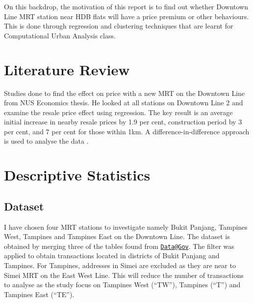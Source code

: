 \documentclass[]{book}
\begin{document}
On this backdrop, the motivation of this report is to find out whether
Downtown Line MRT station near HDB flats will have a price premium or
other behaviours. This is done through regression and clustering
techniques that are learnt for Computational Urban Analysis class.

\chapter{Literature Review}\label{literature-review}

Studies done to find the effect on price with a new MRT on the Downtown
Line from NUS Economics thesis. He looked at all stations on Downtown
Line 2 and examine the resale price effect using regression. The key
result is an average initial increase in nearby resale prices by 1.9 per
cent, construction period by 3 per cent, and 7 per cent for those within
1km. A difference-in-difference approach is used to analyse the data
\citep{Chia}.

\chapter{Descriptive Statistics}\label{descriptive-statistics}

\section{Dataset}\label{dataset}

I have chosen four MRT stations to investigate namely Bukit Panjang,
Tampines West, Tampines and Tampines East on the Downtown Line. The
dataset is obtained by merging three of the tables found from
\href{mailto:Data@Gov}{\nolinkurl{Data@Gov}}. The filter was applied to
obtain transactions located in districts of Bukit Panjang and Tampines.
For Tampines, addresses in Simei are excluded as they are near to Simei
MRT on the East West Line. This will reduce the number of transactions
to analyse as the study focus on Tampines West (``TW''), Tampines
(``T'') and Tampines East (``TE'').
\end{document}
